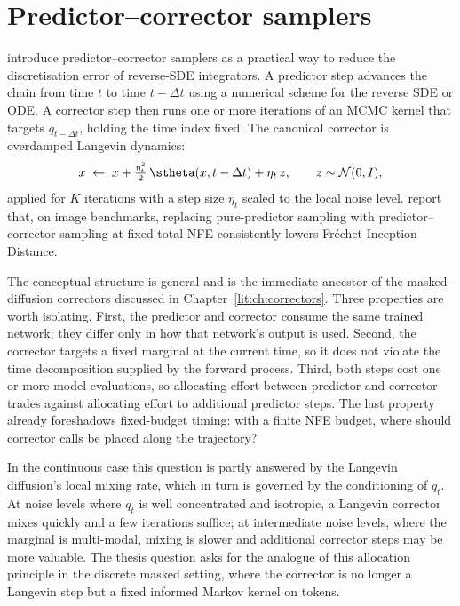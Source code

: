 \section{Predictor--corrector samplers}
\label{lit:sec:pred-corr}

\textcite{song2021score} introduce predictor--corrector samplers as a
practical way to reduce the discretisation error of reverse-SDE
integrators. A predictor step advances the chain from time $t$ to time
$t-\Delta t$ using a numerical scheme for the reverse SDE or ODE. A
corrector step then runs one or more iterations of an MCMC kernel that
targets $q_{t-\Delta t}$, holding the time index fixed. The canonical
corrector is overdamped Langevin dynamics:
\[
  x \;\leftarrow\; x + \tfrac{\eta_t^2}{2}\,\stheta(x,t-\Delta t) + \eta_t\,z,
  \qquad z\sim\mathcal{N}(0,I),
\]
applied for $K$ iterations with a step size $\eta_t$ scaled to the local
noise level. \textcite{song2021score} report that, on image benchmarks,
replacing pure-predictor sampling with predictor--corrector sampling at
fixed total NFE consistently lowers Fr\'echet Inception Distance.

The conceptual structure is general and is the immediate ancestor of the
masked-diffusion correctors discussed in
Chapter~\ref{lit:ch:correctors}. Three properties are worth isolating.
First, the predictor and corrector consume the same trained network; they
differ only in how that network's output is used. Second, the corrector
targets a fixed marginal at the current time, so it does not violate the
time decomposition supplied by the forward process. Third, both steps cost
one or more model evaluations, so allocating effort between predictor and
corrector trades against allocating effort to additional predictor
steps. The last property already foreshadows fixed-budget timing: with a
finite NFE budget, where should corrector calls be placed along the
trajectory?

In the continuous case this question is partly answered by the Langevin
diffusion's local mixing rate, which in turn is governed by the conditioning
of $q_t$. At noise levels where $q_t$ is well concentrated and isotropic, a
Langevin corrector mixes quickly and a few iterations suffice; at
intermediate noise levels, where the marginal is multi-modal, mixing is
slower and additional corrector steps may be more valuable. The thesis
question asks for the analogue of this allocation principle in the discrete
masked setting, where the corrector is no longer a Langevin step but a fixed
informed Markov kernel on tokens.

